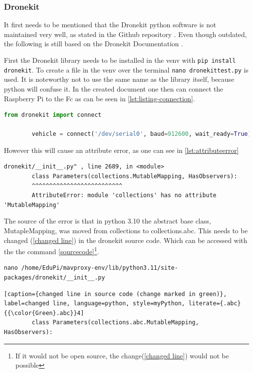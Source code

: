 \documentclass[svgnames]{article}
\begin{document}
	\subsubsection{Dronekit}
	It first needs to be mentioned that the Dronekit python software is not maintained very well, as stated in the Github repository \cite{dronekitgithub}. Even though outdated, the following is still based on the Dronekit Documentation \cite{dronekitdocs}.
	
	First the Dronekit library needs to be installed in the \gls{venv} with \lstinline|pip install dronekit|. To create a file in the \gls{venv} over the terminal \lstinline|nano dronekittest.py| is used. It is noteworthy not to use the same name as the library itself, because python will confuse it. In the created document one then can connect the Raspberry Pi to the \gls{Fc} as can be seen in \cref{lst:listing-connection}.
	\begin{lstlisting}[language=Python, style=myPython, caption=Python DroneKit Example, label=lst:listing-connection]
		from dronekit import connect

		vehicle = connect('/dev/serial0', baud=912600, wait_ready=True)
	\end{lstlisting}
	
	However this will cause an attribute error, as one can see in \cref{lst:attributeerror} 
	\begin{lstlisting}[label=lst:attributeerror, caption={AttributeError after connecting}]
		dronekit/__init__.py" , line 2689, in <module>
		class Parameters(collections.MutableMapping, HasObservers):
		^^^^^^^^^^^^^^^^^^^^^^^^^^
		AttributeError: module 'collections' has no attribute 'MutableMapping'
\end{lstlisting}
	The source of the error is that in python 3.10 the abstract base class, MutapleMapping, was moved from collections to collections.abc. This needs to be changed (\cref{changed line}) in the dronekit source code. Which can be accessed with the the command \cref{sourcecode}\footnote{If it would not be open source, the change(\cref{changed line}) would not be possible}.
	
	\begin{lstlisting}[caption= accessing source code, label=sourcecode]
nano /home/EduPi/mavproxy-env/lib/python3.11/site-packages/dronekit/__init__.py
\end{lstlisting}

	\begin{lstlisting}[caption={changed line in source code (change marked in green)}, label=changed line, language=python, style=myPython, literate={.abc}{{\color{Green}.abc}}4]
		class Parameters(collections.abc.MutableMapping, HasObservers):
	\end{lstlisting}
	
\end{document}

